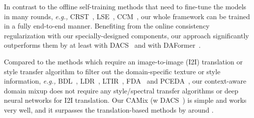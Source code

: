 \documentclass[journal]{IEEEtran}
\begin{document}
{\begin{minipage}{\textwidth}
\begin{table*}[t]
\label{table:ablation_component_level}
\quad
\quad
\quad
\quad
\quad
{}
\vspace{-5mm}
\end{table*}


In contrast to the offline self-training methods that need to fine-tune the models in many rounds, \emph{e.g.,} CRST~\cite{CRST}, LSE~\cite{LSE}, CCM~\cite{CCM}, our whole framework can be trained in a fully end-to-end manner. Benefiting from the online consistency regularization with our specially-designed components, our approach significantly outperforms them by at least  with DACS~\cite{tranheden2020dacs} and  with DAFormer~\cite{hoyer2022daformer}. 

Compared to the methods which require an image-to-image (I2I) translation or style transfer algorithm to filter out the domain-specific texture or style information, \emph{e.g.,} BDL~\cite{BDL}, 
LDR~\cite{LDR}, LTIR~\cite{LTIR}, FDA~\cite{FDA} and PCEDA~\cite{PCEDA}, our context-aware domain mixup does not require any style/spectral transfer algorithms or deep neural networks for I2I translation. Our CAMix (w DACS~\cite{tranheden2020dacs}) is simple and works very well, and it surpasses the translation-based methods by around . 


\end{minipage}}
\end{document}
